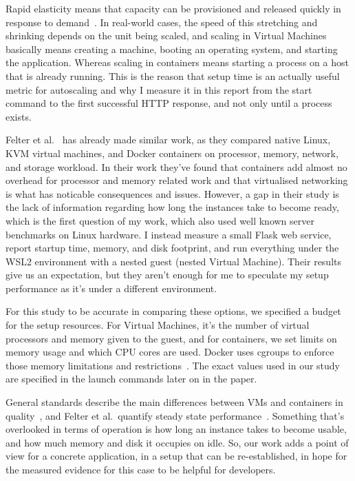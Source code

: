 \documentclass[conference,a4paper]{IEEEtran}
\begin{document}
Rapid elasticity means that capacity can be provisioned and released quickly in response to demand~\cite{b1}. In real-world cases, the speed of this stretching and shrinking depends on the unit being scaled, and scaling in Virtual Machines basically means creating a machine, booting an operating system, and starting the application. Whereas scaling in containers means starting a process on a host that is already running. This is the reason that setup time is an actually useful metric for autoscaling and why I measure it in this report from the start command to the first successful HTTP response, and not only until a process exists.

Felter et al.~\cite{b3} has already made similar work, as they compared native Linux, KVM virtual machines, and Docker containers on processor, memory, network, and storage workload. In their work they’ve found that containers add almost no overhead for processor and memory related work and that virtualised networking is what has noticable consequences and issues. However, a gap in their study is the lack of information regarding how long the instances take to become ready, which is the first question of my work, which also used well known server benchmarks on Linux hardware. I instead measure a small Flask web service, report startup time, memory, and disk footprint, and run everything under the WSL2 environment with a nested guest (nested Virtual Machine). Their results give us an expectation, but they aren’t enough for me to speculate my setup performance as it’s under a different environment.

For this study to be accurate in comparing these options, we specified a budget for the setup resources. For Virtual Machines, it’s the number of virtual processors and memory given to the guest, and for containers, we set limits on memory usage and which CPU cores are used. Docker uses cgroups to enforce those memory limitations and restrictions~\cite{b4}. The exact values used in our study are specified in the launch commands later on in the paper.

General standards describe the main differences between VMs and containers in quality~\cite{b1,b2}, and Felter et al.\ quantify steady state performance~\cite{b3}. Something that’s overlooked in terms of operation is how long an instance takes to become usable, and how much memory and disk it occupies on idle. So, our work adds a point of view for a concrete application, in a setup that can be re-established, in hope for the measured evidence for this case to be helpful for developers.
\end{document}
